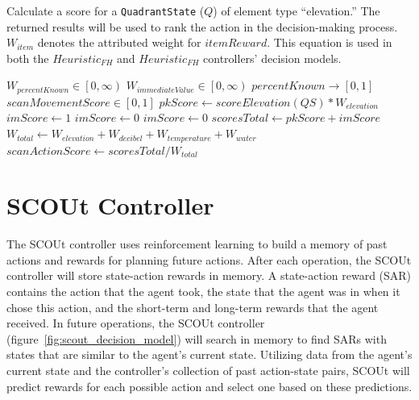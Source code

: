 \begin{algorithm}[!htb]
  \caption{Calculate a score for a \texttt{QuadrantState} ($Q$) of element type ``elevation.'' The returned results will be used to rank the action in the decision-making process. $W_{item}$ denotes the attributed weight for $itemReward$. This equation is used in both the $Heuristic_{FH}$ and $Heuristic_{FH}$ controllers' decision models.}
  \begin{algorithmic} \label{algorithmic:findHuman_scoreElevation}
    \REQUIRE $W_{percentKnown} \in \left[0, \infty \right)$
    \REQUIRE $W_{immediateValue} \in \left[0, \infty \right)$
    \ENSURE $percentKnown \rightarrow \left[0, 1 \right]$
    \ENSURE $scanMovementScore \in \left[0, 1 \right]$
    \STATE $pkScore \leftarrow scoreElevation(QS) * W_{elevation}$
        \STATE $imScore \leftarrow 1$
      \ELSE
        \STATE $imScore \leftarrow 0$
      \ENDIF
    \ELSE
      \STATE $imScore \leftarrow 0$
    \ENDIF
    \STATE $scoresTotal \leftarrow pkScore + imScore$
    \STATE $W_{total} \leftarrow W_{elevation} + W_{decibel} + W_{temperature} + W_{water}$
    \RETURN $scanActionScore \leftarrow scoresTotal / W_{total}$
  \end{algorithmic}
\end{algorithm}


\section{SCOUt Controller} \label{sec:scout_controller}
The SCOUt controller uses reinforcement learning to build a memory of past actions and rewards for planning future actions.
After each operation, the SCOUt controller will store state-action rewards in memory.
A state-action reward (SAR) contains the action that the agent took, the state that the agent was in when it chose this action, and the short-term and long-term rewards that the agent received.
In future operations, the SCOUt controller (figure~\ref{fig:scout_decision_model}) will search in memory to find SARs with states that are similar to the agent's current state.
Utilizing data from the agent's current state and the controller's collection of past action-state pairs, SCOUt will predict rewards for each possible action and select one based on these predictions.

